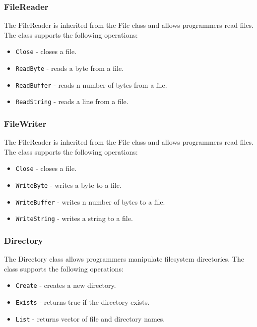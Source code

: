 \documentclass[12pt]{article}
\begin{document}
\subsubsection{FileReader}
The FileReader is inherited from the File class and allows programmers read files.    The class supports the following operations:
\begin{itemize}
    \item \texttt{Close} - closes a file.
    \item \texttt{ReadByte} - reads a byte from a file.
    \item \texttt{ReadBuffer} - reads n number of bytes from a file.
    \item \texttt{ReadString} - reads a line from a file.
\end{itemize}

\subsubsection{FileWriter}
The FileReader is inherited from the File class and allows programmers read files.    The class supports the following operations:
\begin{itemize}
    \item \texttt{Close} - closes a file.
    \item \texttt{WriteByte} - writes a byte to a file.
    \item \texttt{WriteBuffer} - writes n number of bytes to a file.
    \item \texttt{WriteString} - writes a string to a file.
\end{itemize}

\subsubsection{Directory}
The Directory class allows programmers manipulate filesystem directories.    The class supports the following operations:
\begin{itemize}
    \item \texttt{Create} - creates a new directory.
    \item \texttt{Exists} - returns true if the directory exists.
    \item \texttt{List} - returns vector of file and directory names.
\end{itemize}
\end{document}
